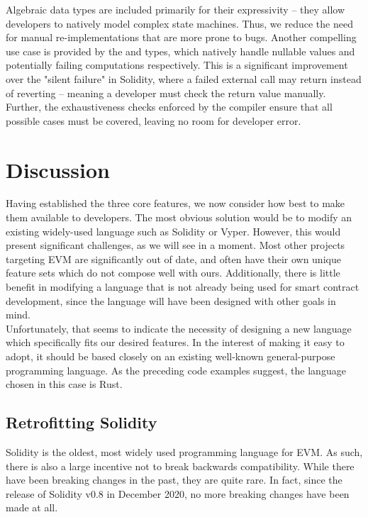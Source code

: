 Algebraic data types are included primarily for their expressivity -- they allow developers to natively model complex state machines. Thus, we reduce the need for manual re-implementations that are more prone to bugs. Another compelling use case is provided by the  and  types, which natively handle nullable values and potentially failing computations respectively. This is a significant improvement over the "silent failure" in Solidity, where a failed external call may return  instead of reverting -- meaning a developer must check the return value manually. Further, the exhaustiveness checks enforced by the compiler ensure that all possible cases must be covered, leaving no room for developer error.

\section{Discussion}
 
Having established the three core features, we now consider how best to make them available to developers. The most obvious solution would be to modify an existing widely-used language such as Solidity or Vyper. However, this would present significant challenges, as we will see in a moment. Most other projects targeting EVM are significantly out of date, and often have their own unique feature sets which do not compose well with ours. Additionally, there is little benefit in modifying a language that is not already being used for smart contract development, since the language will have been designed with other goals in mind. \\
Unfortunately, that seems to indicate the necessity of designing a new language which specifically fits our desired features. In the interest of making it easy to adopt, it should be based closely on an existing well-known general-purpose programming language. As the preceding code examples suggest, the language chosen in this case is Rust. \\

\subsection{Retrofitting Solidity}
Solidity is the oldest, most widely used programming language for EVM. As such, there is also a large incentive not to break backwards compatibility. While there have been breaking changes in the past, they are quite rare. In fact, since the release of Solidity v0.8 in December 2020, no more breaking changes have been made at all.

